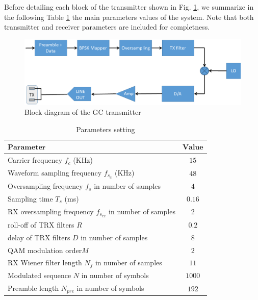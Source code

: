 Before detailing each block of the transmitter shown in Fig. \ref{figTX}, we summarize in the following Table \ref{tab1} the main parameters values of the system. Note that both transmitter and receiver parameters are included for completness.

\begin{figure}
	\includegraphics[width=\textwidth]{figures/GC_testbed/TX.png}
	\caption{Block diagram of the GC transmitter} \label{figTX}
\end{figure}

\begin{table}
	\caption{Parameters setting}\label{tab1}
	\begin{tabular}{|l|c|}
		\hline
		$\mathbf{Parameter}$ & $\mathbf{Value}$\\  
		\hline
		Carrier frequency $f_c$ (KHz) & $15$\\ 
		Waveform sampling frequency $f_{s_a}$ (KHz) & $48$ \\ %
		Oversampling frequency $f_s$ in number of samples & $4$\\ %
		Sampling time $T_s$ (ms) & $0.16$\\
		RX oversampling frequency $f_{s_{rx}}$ in number of samples & $2$\\ %
		roll-off of TRX filters $R$ & $0.2$\\ 
		delay of TRX filters  $D$ in number of samples & $8$\\
		QAM modulation order$M$ & $2$\\
		RX Wiener filter length $N_f$ in number of samples & $11$\\ 
		Modulated sequence $N$ in number of symbols & $1000$\\
		Preamble length $N_{pre}$ in number of symbols & $192$\\
		\hline
	\end{tabular}
\end{table}

